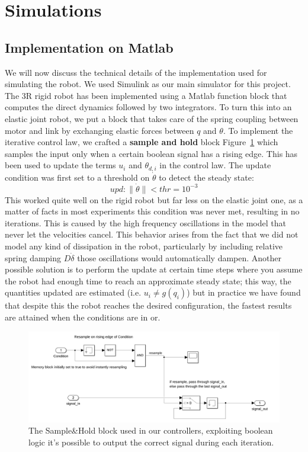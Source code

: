 \section{Simulations}
\subsection{Implementation on Matlab}
We will now discuss the technical details of the implementation used for simulating the robot. We used Simulink as our main simulator for this project. The 3R rigid robot has been implemented using a Matlab function block that computes the direct dynamics followed by two integrators. To turn this into an elastic joint robot, we put a block that takes care of the spring coupling between motor and link by exchanging elastic forces between \(q\) and \(\theta\). To implement the iterative control law, we crafted a \textbf{sample and hold} block Figure~\ref{sandh} which samples the input only when a certain boolean signal has a rising edge. This has been used to update the terms \(u_i\) and \(\theta_{d,i}\) in the control law. The update condition was first set to a threshold on \(\dot \theta\) to detect the steady state:
\[
    upd : \| \dot \theta \| < thr = 10^{-3}
\]
This worked quite well on the rigid robot but far less on the elastic joint one, as a matter of facts in most experiments this condition was never met, resulting in no iterations. This is caused by the high frequency oscillations in the model that never let the velocities cancel. This behavior arises from the fact that we did not model any kind of dissipation in the robot, particularly by including relative spring damping \(D\dot \delta\) those oscillations would automatically dampen. Another possible solution is to perform the update at certain time steps where you assume the robot had enough time to reach an approximate steady state; this way, the quantities updated are estimated (i.e. \(u_i \neq g(q_i) \)) but in practice we have found that despite this the robot reaches the desired configuration, the fastest results are attained when the conditions are in or.

\begin{figure}[h!]
\centerline{\includegraphics[scale=0.5]{figures/sampleandhold.png}}
\caption{\label{sandh}
The Sample\&Hold block used in our controllers, exploiting boolean logic it's possible to output the correct signal during each iteration.}
\end{figure}
